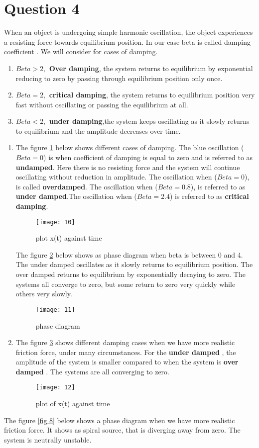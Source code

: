 \documentclass[12pt,a4paper]{article}
\begin{document}
\section*{Question 4}
When an object is undergoing simple harmonic oscillation, the object experiences a resisting force towards equilibrium position. In our case beta is called damping coefficient . We will consider for cases of damping.
\begin{enumerate}
\item[•]
\textbf{$Beta >2,$ Over damping}, the system returns to equilibrium by exponential reducing to zero by passing through equilibrium position only once.
\item[•]
\textbf{$Beta =2,$ critical damping}, the system returns to equilibrium position very fast without oscillating or passing the equilibrium at all.
\item[•]
\textbf{$Beta <2,$ under damping},the system keeps oscillating as it slowly returns to equilibrium and the amplitude decreases over time.
\end{enumerate}

\begin{enumerate}
\item[1]
The figure \ref{fig 5} below shows different cases of damping. The blue oscillation ($Beta =0$) is when coefficient of damping is equal to zero and is referred to as \textbf{undamped}. Here there is no resisting force and the system will continue oscillating without reduction in amplitude. The oscillation when ($Beta =0$), is called \textbf{overdamped}. The oscillation when ($Beta =0.8$), is referred to as \textbf{under damped}.The oscillation when ($Beta= 2.4$) is referred to as \textbf{critical damping}.
\begin{figure}[H]
\texttt{[image: 10]}
\centering
\caption{plot x(t) against time}
\label{fig 5}
\end{figure}
The figure \ref{fig 6} below shows as phase diagram when beta is between 0 and 4. The under damped oscillates as it slowly returns to equilibrium position. The over damped returns to equilibrium by exponentially decaying to zero. The systems all converge to zero, but some return to zero very quickly while others very slowly.

\begin{figure}[H]
\texttt{[image: 11]}
\centering
\caption{phase diagram}
\label{fig 6}
\end{figure}
\item[2]
The figure \ref{fig 7} shows different damping cases when we have more realistic friction force, under many circumstances. For the \textbf{under damped }, the amplitude of the system is smaller compared to when the system is  \textbf{over damped }. The systems are all converging to zero.\\
\begin{figure}[H]
\texttt{[image: 12]}
\centering
\caption{plot of x(t) against time }
\label{fig 7}
\end{figure}
\end{enumerate}
The figure \ref{fig 8} below shows a phase diagram when we have more realistic friction force. It shows as spiral source, that is diverging away from zero. The system is neutrally unstable.
\end{document}
